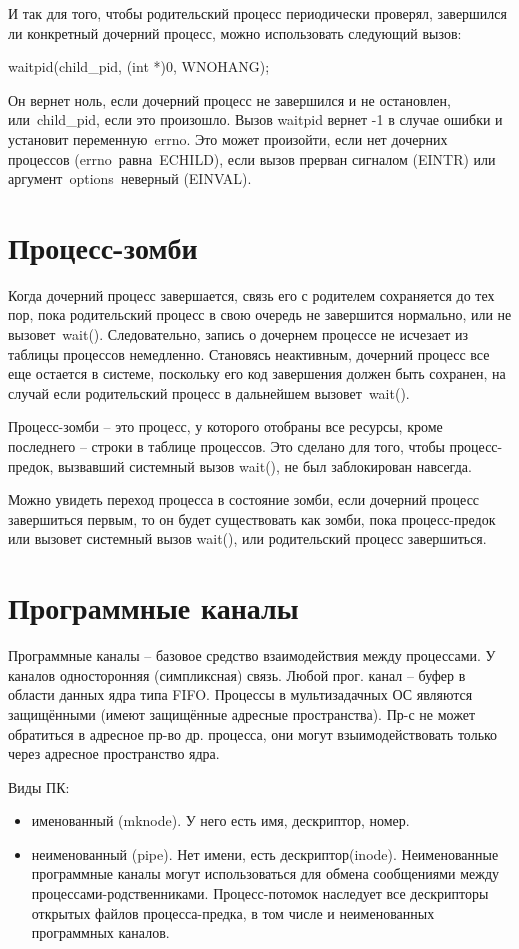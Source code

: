 И так для того, чтобы родительский процесс периодически проверял, завершился ли конкретный дочерний процесс, можно использовать следующий вызов:

waitpid(child\_pid, (int *)0, WNOHANG);

Он вернет ноль, если дочерний процесс не завершился и не остановлен, или child\_pid, если это произошло. Вызов waitpid вернет -1 в случае ошибки и установит переменную errno. Это может произойти, если нет дочерних процессов (errno равна ECHILD), если вызов прерван сигналом (EINTR) или аргумент options неверный (EINVAL).

\section{Процесс-зомби}
Когда дочерний процесс завершается, связь его с родителем сохраняется до тех пор, пока родительский процесс в свою очередь не завершится нормально, или не вызовет wait(). Следовательно, запись о дочернем процессе не исчезает из таблицы процессов немедленно. Становясь неактивным, дочерний процесс все еще остается в системе, поскольку его код завершения должен быть сохранен, на случай если родительский процесс в дальнейшем вызовет wait(). 

Процесс-зомби – это процесс, у которого отобраны все ресурсы, кроме последнего – строки в таблице процессов. Это сделано для того, чтобы процесс-предок, вызвавший системный вызов wait(), не был заблокирован навсегда.

Можно увидеть переход процесса в состояние зомби, если дочерний процесс завершиться первым, то он будет существовать как зомби, пока процесс-предок или вызовет системный вызов wait(), или  родительский процесс завершиться.

\section{Программные каналы}
Программные каналы -- базовое средство взаимодействия между процессами.
У каналов односторонняя (симпликсная) связь.
Любой прог. канал -- буфер в области данных ядра типа FIFO. 
Процессы в мультизадачных ОС являются защищёнными (имеют защищённые адресные пространства). Пр-с не может обратиться в адресное пр-во др. процесса, они могут взыимодействовать только через адресное пространство ядра.

Виды ПК:
\begin{itemize}
	\item именованный (mknode). У него есть имя, дескриптор, номер. 
	\item неименованный (pipe). Нет имени, есть дескриптор(inode). Неименованные программные каналы могут использоваться для обмена сообщениями между процессами-родственниками.
	Процесс-потомок наследует все дескрипторы открытых файлов процесса-предка, в том числе и неименованных программных каналов.
\end{itemize}

